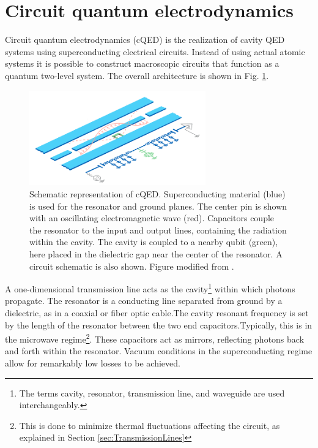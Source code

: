 \documentclass[11 pt, oneside]{book} %
\begin{document}
\section{Circuit quantum electrodynamics}
Circuit quantum electrodynamics (cQED) is the realization of cavity QED systems using superconducting electrical circuits. Instead of using actual atomic systems it is possible to construct macroscopic circuits that function as a quantum two-level system. The overall architecture is shown in Fig. \ref{fig:cQEDSchematic}.

\begin{figure}[h] 
   \centering
   \includegraphics[width=3in]{SchustercQEDSchematic.png} 
   \caption[Schematic representation of cQED]{Schematic representation of cQED. Superconducting material (blue) is used for the resonator and ground planes. The center pin is shown with an oscillating electromagnetic wave (red). Capacitors couple the resonator to the input and output lines, containing the radiation within the cavity. The cavity is coupled to a nearby qubit (green), here placed in the dielectric gap near the center of the resonator. A circuit schematic is also shown. Figure modified from \cite{Schuster}.}
   \label{fig:cQEDSchematic}
\end{figure}

A one-dimensional transmission line acts as the cavity\footnote{The terms cavity, resonator, transmission line, and waveguide are used interchangeably.} within which photons propagate. The resonator is a conducting line separated from ground by a dielectric, as in a coaxial or fiber optic cable.The cavity resonant frequency is set by the length of the resonator between the two end capacitors.Typically, this is in the microwave regime\footnote{This is done to minimize thermal fluctuations affecting the circuit, as explained in Section \ref{sec:TransmissionLines}}. These capacitors act as mirrors, reflecting photons back and forth within the resonator. Vacuum conditions in the superconducting regime allow for remarkably low losses to be achieved.
\end{document}
